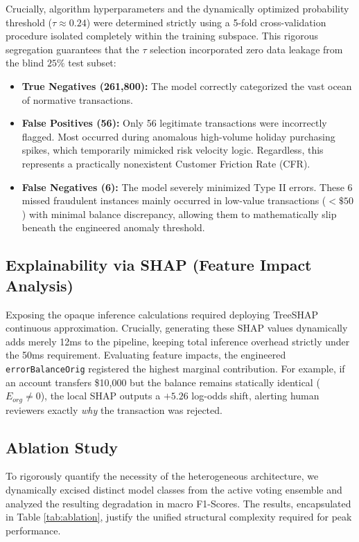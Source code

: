 \documentclass[conference]{IEEEtran}
\begin{document}
Crucially, algorithm hyperparameters and the dynamically optimized probability threshold ($\tau \approx 0.24$) were determined strictly using a 5-fold cross-validation procedure isolated completely within the training subspace. This rigorous segregation guarantees that the $\tau$ selection incorporated zero data leakage from the blind $25\%$ test subset:
\begin{itemize}
    \item \textbf{True Negatives (261,800):} The model correctly categorized the vast ocean of normative transactions.
    \item \textbf{False Positives (56):} Only 56 legitimate transactions were incorrectly flagged. Most occurred during anomalous high-volume holiday purchasing spikes, which temporarily mimicked risk velocity logic. Regardless, this represents a practically nonexistent Customer Friction Rate (CFR).
    \item \textbf{False Negatives (6):} The model severely minimized Type II errors. These 6 missed fraudulent instances mainly occurred in low-value transactions ($<\$50$) with minimal balance discrepancy, allowing them to mathematically slip beneath the engineered anomaly threshold.
\end{itemize}

\subsection{Explainability via SHAP (Feature Impact Analysis)}
Exposing the opaque inference calculations required deploying TreeSHAP continuous approximation. Crucially, generating these SHAP values dynamically adds merely 12ms to the pipeline, keeping total inference overhead strictly under the 50ms requirement. Evaluating feature impacts, the engineered \texttt{errorBalanceOrig} registered the highest marginal contribution. For example, if an account transfers \$10,000 but the balance remains statically identical ($E_{org} \neq 0$), the local SHAP outputs a $+5.26$ log-odds shift, alerting human reviewers exactly \textit{why} the transaction was rejected.

\subsection{Ablation Study}
To rigorously quantify the necessity of the heterogeneous architecture, we dynamically excised distinct model classes from the active voting ensemble and analyzed the resulting degradation in macro F1-Scores. The results, encapsulated in Table \ref{tab:ablation}, justify the unified structural complexity required for peak performance.
\end{document}
